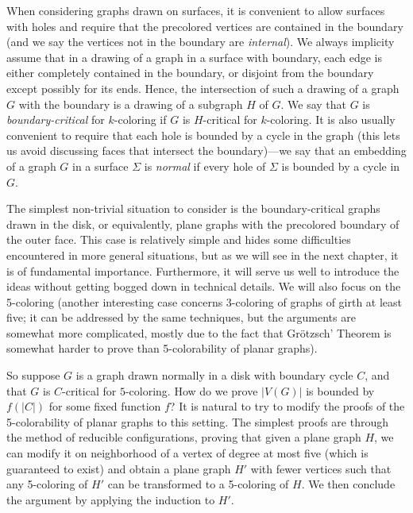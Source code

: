 \documentclass[12pt,twoside,openright,a4paper]{book}
\begin{document}
When considering graphs drawn on surfaces, it is convenient to allow surfaces with holes and require that the precolored
vertices are contained in the boundary (and we say the vertices not in the boundary are \emph{internal}).
We always implicity assume that in a drawing of a graph in a surface with boundary,
each edge is either completely contained in the boundary, or disjoint from the boundary except possibly for its ends.
Hence, the intersection of such a drawing of a graph $G$ with the boundary is a drawing of a subgraph $H$ of $G$.
We say that $G$ is \emph{boundary-critical} for $k$-coloring if $G$ is $H$-critical for $k$-coloring.
It is also usually convenient to require that each hole is bounded by a cycle
in the graph (this lets us avoid discussing faces that intersect the boundary)---we say that an embedding of a graph
$G$ in a surface $\Sigma$ is \emph{normal} if every hole of $\Sigma$ is bounded by a cycle in $G$.

The simplest non-trivial situation to consider is the boundary-critical graphs drawn in the disk, or equivalently,
plane graphs with the precolored boundary of the outer face.  This case is relatively simple and hides some difficulties
encountered in more general situations, but as we will see in the next chapter, it is of fundamental importance.
Furthermore, it will serve us well to introduce the ideas without getting bogged down in technical details.
We will also focus on the 5-coloring (another interesting case concerns 3-coloring of graphs of girth at least five;
it can be addressed by the same techniques, but the arguments are somewhat more complicated, mostly due to the
fact that Gr\"otzsch' Theorem is somewhat harder to prove than 5-colorability of planar graphs).

So suppose $G$ is a graph drawn normally in a disk with boundary cycle $C$, and that $G$ is $C$-critical for $5$-coloring.
How do we prove $|V(G)|$ is bounded by $f(|C|)$ for some fixed function $f$?  It is natural to try to modify the proofs of the 5-colorability
of planar graphs to this setting.  The simplest proofs are through the method of reducible configurations, proving
that given a plane graph $H$, we can modify it on neighborhood of a vertex of degree at most five (which is guaranteed to exist)
and obtain a plane graph $H'$ with fewer vertices such that any 5-coloring of $H'$ can be transformed to a 5-coloring of $H$.
We then conclude the argument by applying the induction to $H'$.
\end{document}
